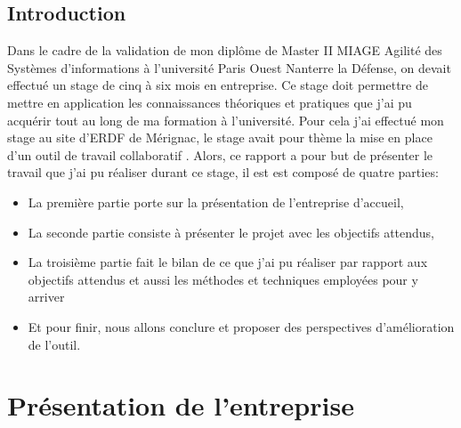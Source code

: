 \section*{Introduction}
Dans le cadre de la validation de mon diplôme de Master II MIAGE Agilité des Systèmes d'informations à l'université Paris Ouest Nanterre la Défense, on devait effectué un stage de cinq à six mois en entreprise. Ce stage doit permettre de mettre en application les connaissances théoriques et pratiques que j'ai pu acquérir tout au long de ma formation à l'université.
Pour cela j'ai effectué mon stage au site d'ERDF de Mérignac, le stage avait pour thème \og la mise en place d'un outil de travail collaboratif \fg{}. Alors, ce rapport a pour but de présenter le travail que j'ai pu réaliser durant ce stage, il est est composé de quatre parties: 
\begin{itemize}
\item La première partie porte sur la présentation de l'entreprise d'accueil,
\item La seconde partie consiste à présenter le projet avec les objectifs attendus,
\item La troisième partie fait le bilan de ce que j'ai pu réaliser par rapport aux objectifs attendus et aussi les méthodes et techniques employées pour y arriver
\item Et pour finir, nous allons conclure et proposer des perspectives d'amélioration de l'outil.
\end{itemize}
\chapter{Présentation de l'entreprise} %

\label{Chapter1} %

